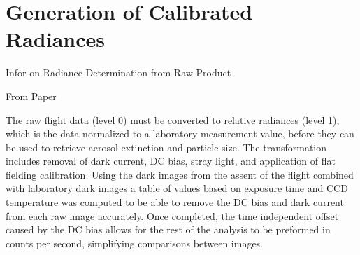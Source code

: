 \section{Generation of Calibrated Radiances}

Infor on Radiance Determination from Raw Product 

From Paper

The raw flight data (level 0) must be converted to relative radiances (level 1), which is the data normalized to a laboratory measurement value, before they can be used to retrieve aerosol extinction and particle size. The transformation includes removal of dark current, DC bias, stray light, and application of flat fielding calibration. Using the dark images from the assent of the flight combined with laboratory dark images a table of values based on exposure time and CCD temperature was computed to be able to remove the DC bias and dark current from each raw image accurately. Once completed, the time independent offset caused by the DC bias allows for the rest of the analysis to be preformed in counts per second, simplifying comparisons between images. %

